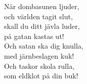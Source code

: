 \vspace{10pt}
När dombasunen ljuder,\\
och världen tagit slut,\\
skall du ditt jävla luder,\\
på gatan kastas ut!\\
Och satan ska dig knulla,\\
med järnbeslagen kuk!\\
Och taskor skola rulla,\\
som eldklot på din buk!
